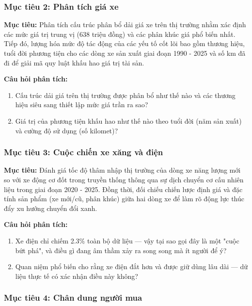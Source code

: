 \subsubsection{Mục tiêu 2: Phân tích giá xe}
 
\noindent\textbf{Mục tiêu:} Phân tích cấu trúc phân bổ dải giá xe trên thị trường nhằm xác định các mức giá trị trung vị (638 triệu đồng) và các phân khúc giá phổ biến nhất. Tiếp đó, lượng hóa mức độ tác động của các yếu tố cốt lõi bao gồm thương hiệu, tuổi đời phương tiện cho các dòng xe sản xuất giai đoạn 1990 - 2025 và số km đã đi để giải mã quy luật khấu hao giá trị tài sản.

\noindent\textbf{Câu hỏi phân tích:}
\begin{enumerate}
  \item Cấu trúc dải giá trên thị trường được phân bổ như thế nào và các thương hiệu siêu sang thiết lập mức giá trần ra sao?
  \item Giá trị của phương tiện khấu hao như thế nào theo tuổi đời (năm sản xuất) và cường độ sử dụng (số kilomet)?
\end{enumerate}


\subsubsection{Mục tiêu 3: Cuộc chiến xe xăng và điện}
 
\noindent\textbf{Mục tiêu:} Đánh giá tốc độ thâm nhập thị trường của dòng xe năng lượng mới so với xe động cơ đốt trong truyền thống thông qua sự dịch chuyển cơ cấu nhiên liệu trong giai đoạn 2020 - 2025. Đồng thời, đối chiếu chiến lược định giá và đặc tính sản phẩm (xe mới/cũ, phân khúc) giữa hai dòng xe để làm rõ động lực thúc đẩy xu hướng chuyển đổi xanh.

\noindent\textbf{Câu hỏi phân tích:}
\begin{enumerate}
  \item Xe điện chỉ chiếm 2.3\% toàn bộ dữ liệu — vậy tại sao gọi đây là một "cuộc bứt phá", và điều gì đang âm thầm xảy ra song song mà ít người để ý?
  \item Quan niệm phổ biến cho rằng xe điện đắt hơn và được giữ dùng lâu dài — dữ liệu thực tế có xác nhận điều này không?
\end{enumerate}

\subsubsection{Mục tiêu 4: Chân dung người mua}
 
